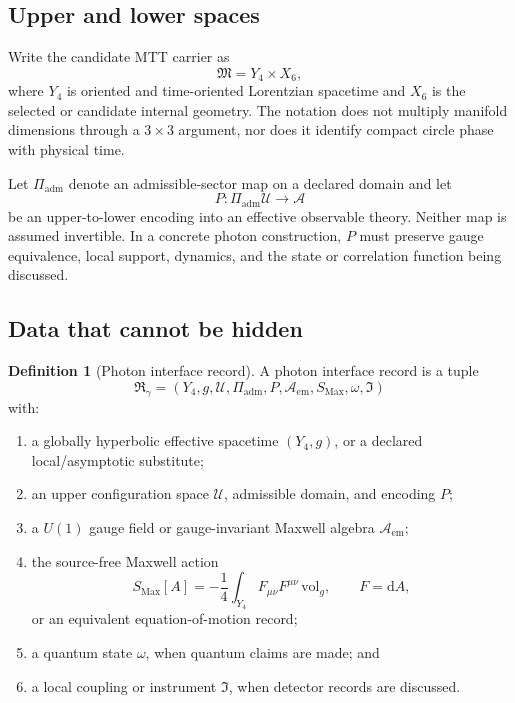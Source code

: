 \documentclass[11pt,a4paper]{article}
\numberwithin{equation}{section}
\theoremstyle{definition}
\newtheorem{definition}[theorem]{Definition}
\theoremstyle{remark}
\newcommand{\dd}{\mathrm{d}}
\newcommand{\cA}{\mathcal A}
\newcommand{\cU}{\mathcal U}
\begin{document}
\subsection{Upper and lower spaces}

Write the candidate MTT carrier as
\begin{equation}
\mathfrak M=Y_4\times X_6,
\label{eq:carrier}
\end{equation}
where \(Y_4\) is oriented and time-oriented Lorentzian spacetime and
\(X_6\) is the selected or candidate internal geometry.  The notation
does not multiply manifold dimensions through a \(3\times3\) argument,
nor does it identify compact circle phase with physical time.

Let \(\Pi_{\mathrm{adm}}\) denote an admissible-sector map on a declared
domain and let
\[
P:\Pi_{\mathrm{adm}}\cU\longrightarrow\cA
\]
be an upper-to-lower encoding into an effective observable theory.
Neither map is assumed invertible.  In a concrete photon construction,
\(P\) must preserve gauge equivalence, local support, dynamics, and the
state or correlation function being discussed.

\subsection{Data that cannot be hidden}

\begin{definition}[Photon interface record]
A photon interface record is a tuple
\[
\mathfrak R_\gamma=
(Y_4,g,\cU,\Pi_{\mathrm{adm}},P,
\cA_{\mathrm{em}},S_{\mathrm{Max}},\omega,\mathfrak I)
\]
with:
\begin{enumerate}[label=(\roman*)]
\item a globally hyperbolic effective spacetime \((Y_4,g)\), or a
declared local/asymptotic substitute;
\item an upper configuration space \(\cU\), admissible domain, and
encoding \(P\);
\item a \(U(1)\) gauge field or gauge-invariant Maxwell algebra
\(\cA_{\mathrm{em}}\);
\item the source-free Maxwell action
\[
S_{\mathrm{Max}}[A]=-\frac14\int_{Y_4}
F_{\mu\nu}F^{\mu\nu}\,\mathrm{vol}_g,
\qquad F=\dd A,
\]
or an equivalent equation-of-motion record;
\item a quantum state \(\omega\), when quantum claims are made; and
\item a local coupling or instrument \(\mathfrak I\), when detector
records are discussed.
\end{enumerate}
\end{definition}
\end{document}

